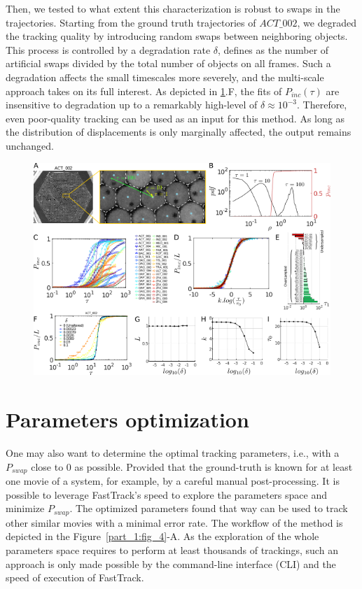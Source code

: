     Then, we tested to what extent this characterization is robust to swaps in the trajectories. Starting from the ground truth trajectories of $ACT\_002$, we degraded the tracking quality by introducing random swaps between neighboring objects. This process is controlled by a degradation rate $\delta$, defines as the number of artificial swaps divided by the total number of objects on all frames. Such a degradation affects the small timescales more severely, and the multi-scale approach takes on its full interest. As depicted in \ref{part_1:fig_3}.F, the fits of $P_{inc}(\tau)$ are insensitive to degradation up to a remarkably high-level of $\delta \approx 10^{-3}$. Therefore, even poor-quality tracking can be used as an input for this method. As long as the distribution of displacements is only marginally affected, the output remains unchanged.

    \begin{figure}[h!]
    \centering
    \includegraphics[width=1\textwidth]{part_1/assets/Figure_3.png}
    \caption{\textbf{}}
    \label{part_1:fig_3}
    \end{figure}

    \section{Parameters optimization}
    One may also want to determine the optimal tracking parameters, i.e., with a $P_{swap}$ close to 0 as possible. Provided that the ground-truth is known for at least one movie of a system, for example, by a careful manual post-processing. It is possible to leverage FastTrack's speed to explore the parameters space and minimize $P_{swap}$. The optimized parameters found that way can be used to track other similar movies with a minimal error rate. The workflow of the method is depicted in the Figure~\ref{part_1:fig_4}-A. As the exploration of the whole parameters space requires to perform at least thousands of trackings, such an approach is only made possible by the command-line interface (CLI) and the speed of execution of FastTrack.

